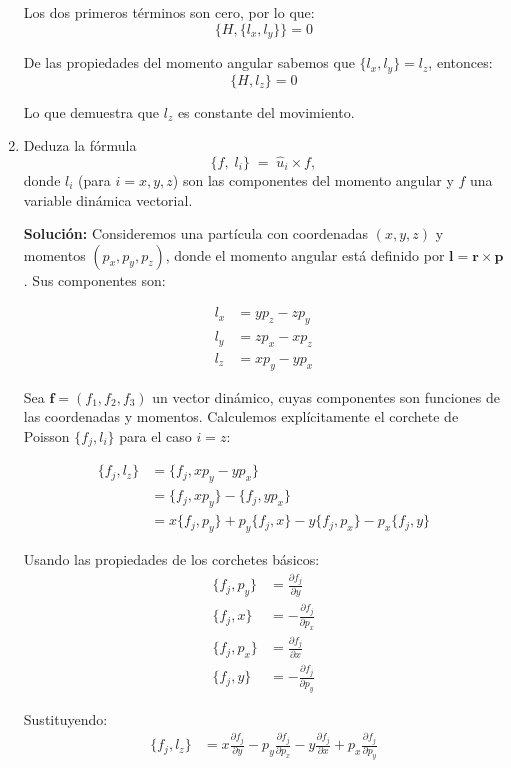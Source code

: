 \documentclass[12pt]{article}
\begin{document}
\begin{enumerate}
  Los dos primeros términos son cero, por lo que:
  \[
  \{H,\{l_x,l_y\}\} = 0
  \]

  De las propiedades del momento angular sabemos que \(\{l_x,l_y\} = l_z\), entonces:
  \[
  \{H,l_z\} = 0
  \]

  Lo que demuestra que \(l_z\) es constante del movimiento.
  
  \item Deduza la fórmula
    \[
      \{f,\;l_i\} \;=\;\hat u_i\times f,
    \]
    donde \(l_i\) (para \(i=x,y,z\)) son las componentes del momento angular y \(f\) una variable dinámica vectorial.

  \textbf{Solución:}
  Consideremos una partícula con coordenadas $(x,y,z)$ y momentos $(p_x,p_y,p_z)$, donde el momento angular está definido por $\mathbf{l} = \mathbf{r} \times \mathbf{p}$. Sus componentes son:

  \begin{align}
  l_x &= yp_z - zp_y\\
  l_y &= zp_x - xp_z\\
  l_z &= xp_y - yp_x
  \end{align}

  Sea $\mathbf{f} = (f_1, f_2, f_3)$ un vector dinámico, cuyas componentes son funciones de las coordenadas y momentos. Calculemos explícitamente el corchete de Poisson $\{f_j, l_i\}$ para el caso $i=z$:

  \begin{align}
  \{f_j, l_z\} &= \{f_j, xp_y - yp_x\}\\
  &= \{f_j, xp_y\} - \{f_j, yp_x\}\\
  &= x\{f_j, p_y\} + p_y\{f_j, x\} - y\{f_j, p_x\} - p_x\{f_j, y\}
  \end{align}

  Usando las propiedades de los corchetes básicos:
  \begin{align}
  \{f_j, p_y\} &= \frac{\partial f_j}{\partial y}\\
  \{f_j, x\} &= -\frac{\partial f_j}{\partial p_x}\\
  \{f_j, p_x\} &= \frac{\partial f_j}{\partial x}\\
  \{f_j, y\} &= -\frac{\partial f_j}{\partial p_y}
  \end{align}

  Sustituyendo:
  \begin{align}
  \{f_j, l_z\} &= x\frac{\partial f_j}{\partial y} - p_y\frac{\partial f_j}{\partial p_x} - y\frac{\partial f_j}{\partial x} + p_x\frac{\partial f_j}{\partial p_y}
  \end{align}


\end{enumerate}
\end{document}

